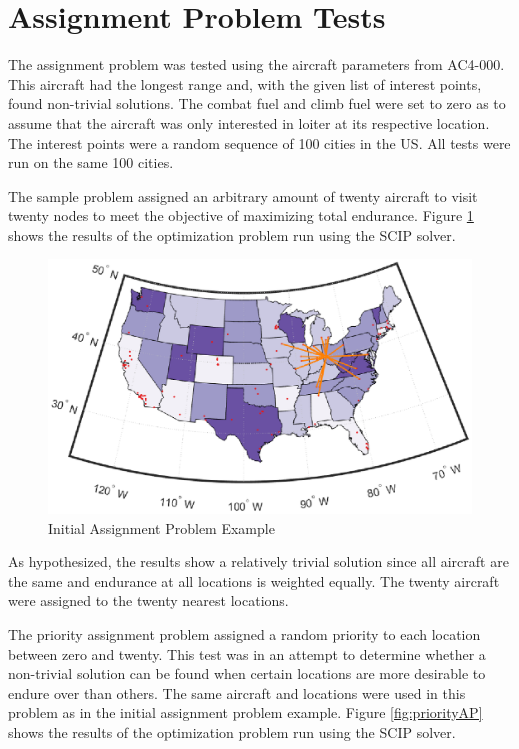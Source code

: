 \section{Assignment Problem Tests}
The assignment problem was tested using the aircraft parameters from AC4-000. This aircraft had the longest range and, with the given list of interest points, found non-trivial solutions. The combat fuel and climb fuel were set to zero as to assume that the aircraft was only interested in loiter at its respective location. The interest points were a random sequence of 100 cities in the US. All tests were run on the same 100 cities. \par
The sample problem assigned an arbitrary amount of twenty aircraft to visit twenty nodes to meet the objective of maximizing total endurance. Figure \ref{fig:trivialAP} shows the results of the optimization problem run using the SCIP solver.\par
\begin{figure}[H]
    \centering
    \includegraphics{Thesis/Method_II/trivialAP.eps}
    \caption{Initial Assignment Problem Example}
    \label{fig:trivialAP}
\end{figure}
As hypothesized, the results show a relatively trivial solution since all aircraft are the same and endurance at all locations is weighted equally. The twenty aircraft were assigned to the twenty nearest locations.\par
The priority assignment problem assigned a random priority to each location between zero and twenty. This test was in an attempt to determine whether a non-trivial solution can be found when certain locations are more desirable to endure over than others. The same aircraft and locations were used in this problem as in the initial assignment problem example. Figure \ref{fig:priorityAP} shows the results of the optimization problem run using the SCIP solver.
